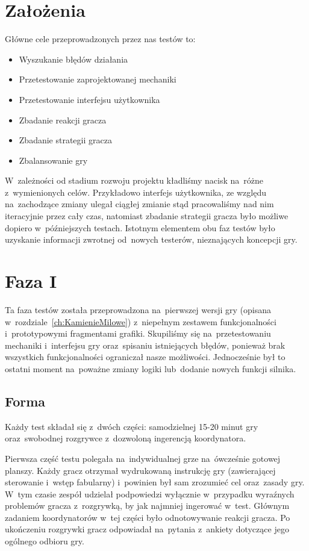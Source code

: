 \documentclass[licencjacka]{pracamgr}
\begin{document}
  \section{Założenia}
    Główne cele przeprowadzonych przez nas testów to:
    \begin{itemize}
      \item Wyszukanie błędów działania
      \item Przetestowanie zaprojektowanej mechaniki
      \item Przetestowanie interfejsu użytkownika
      \item Zbadanie reakcji gracza
      \item Zbadanie strategii gracza
      \item Zbalansowanie gry
    \end{itemize}
    W~zależności od stadium rozwoju projektu kładliśmy nacisk na~różne z~wymienionych celów. Przykładowo interfejs
    użytkownika, ze względu na~zachodzące zmiany ulegał ciągłej zmianie stąd pracowaliśmy nad nim iteracyjnie przez cały
    czas, natomiast zbadanie strategii gracza było możliwe dopiero w~późniejszych testach. Istotnym elementem obu faz
    testów było uzyskanie informacji zwrotnej od~nowych testerów, nieznających koncepcji gry.

  \section{Faza I}
    Ta faza testów została przeprowadzona na~pierwszej wersji gry (opisana w~rozdziale~\ref{ch:KamienieMilowe})
    z~niepełnym zestawem funkcjonalności i~prototypowymi fragmentami grafiki. Skupiliśmy się na~przetestowaniu mechaniki
    i~interfejsu gry oraz~spisaniu istniejących błędów, ponieważ brak wszystkich funkcjonalności ograniczał nasze
    możliwości. Jednocześnie był to ostatni moment na~poważne zmiany logiki lub~dodanie nowych funkcji silnika.

    \subsection{Forma}
      Każdy test składał  się z~dwóch części: samodzielnej 15-20 minut gry
      oraz~swobodnej rozgrywce z~dozwoloną ingerencją koordynatora.

      Pierwsza część testu polegała na~indywidualnej grze na~ówcześnie gotowej planszy. Każdy gracz otrzymał wydrukowaną
      instrukcję gry (zawierającej sterowanie i~wstęp fabularny) i~powinien był sam zrozumieć cel oraz~zasady gry.
      W~tym czasie zespół udzielał podpowiedzi wyłącznie w~przypadku wyraźnych problemów gracza z~rozgrywką, by jak
      najmniej ingerować w~test. Głównym zadaniem koordynatorów w~tej części było odnotowywanie reakcji gracza.
      Po ukończeniu rozgrywki gracz odpowiadał na~pytania z~ankiety dotyczące jego ogólnego odbioru gry.
\end{document}
